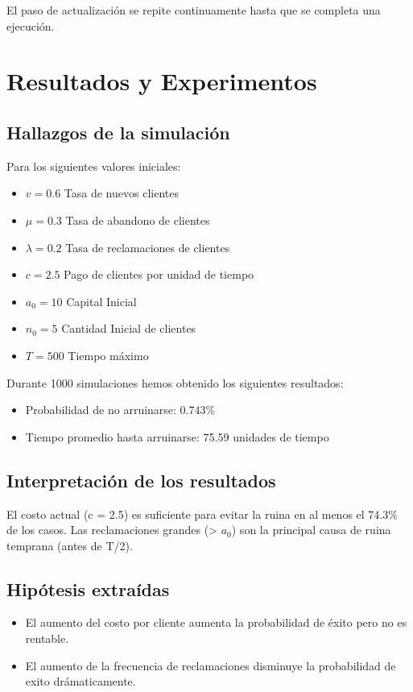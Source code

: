 \documentclass[12pt, a4paper]{article}
\begin{document}
El paso de actualización se repite continuamente hasta que se completa una ejecución.

\section{Resultados y Experimentos} 
\subsection*{Hallazgos de la simulación}
Para los siguientes valores iniciales:
\begin{itemize}
   \item $v=0.6$ Tasa de nuevos clientes
   \item $\mu=0.3$ Tasa de abandono de clientes
   \item $\lambda = 0.2$ Tasa de reclamaciones de clientes
   \item $c=2.5$ Pago de clientes por unidad de tiempo
   \item $a_0=10$ Capital Inicial
   \item $n_0=5$ Cantidad Inicial de clientes
   \item $T=500$ Tiempo máximo
\end{itemize}
Durante 1000 simulaciones hemos obtenido los siguientes resultados:
\begin{itemize}
    \item Probabilidad de no arruinarse: 0.743\%
    \item Tiempo promedio hasta arruinarse: 75.59 unidades de tiempo
\end{itemize}
\subsection*{Interpretación de los resultados}
El costo actual (c = 2.5) es suficiente para evitar la ruina en al menos el 74.3\% de los casos.
Las reclamaciones grandes (> $a_0$) son la principal causa de ruina temprana (antes de T/2).
\subsection*{Hipótesis extraídas}
\begin{itemize}
    \item El aumento del costo por cliente aumenta la probabilidad de éxito pero no es rentable.
    \item El aumento de la frecuencia de reclamaciones disminuye la probabilidad de exito drámaticamente.
\end{itemize}
\end{document}
